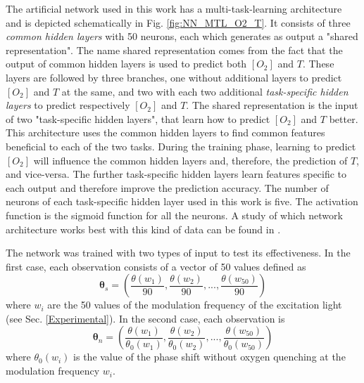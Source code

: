 \documentclass[9pt,twocolumn,twoside,pdftex]{optica}
\begin{document}
The artificial network used in this work has a multi-task-learning architecture and is depicted schematically in Fig. \ref{fig:NN_MTL_O2_T}. It consists of three {\sl common hidden layers} with 50 neurons, each which generates as output a "shared representation". The name shared representation comes from the fact that the output of common hidden layers is used to predict both $[O_2]$ and $T$. These layers are followed by three branches, one without additional layers to predict $[O_2]$ and $T$ at the same, and two with each two additional {\sl task-specific hidden layers} to predict respectively $[O_2]$ and $T$. The shared representation is the input of two "task-specific hidden layers", that learn how to predict $[O_2]$ and $T$ better. This architecture uses the common hidden layers to find common features beneficial to each of the two tasks. During the training phase, learning to predict $[O_2]$ will influence the common hidden layers and, therefore, the prediction of $T$, and vice-versa. The further task-specific hidden layers learn features specific to each output and therefore improve the prediction accuracy. The number of neurons of each task-specific hidden layer used in this work is five. The activation function is the sigmoid function for all the neurons.  A study of which network architecture works best with this kind of data can be found in \cite{Michelucci2019_2}.

The network was trained with two types of input to test its effectiveness. In the first case, each observation consists of a vector of 50 values defined as
\begin{equation}
\label{input1}
{\pmb \theta}_s = \left(
\frac{\theta(w_1)}{90} , \frac{\theta(w_2)}{90} , ..., \frac{\theta(w_{50})}{90} 
\right)
\end{equation}
where $w_i$ are the 50 values of the modulation frequency of the excitation light (see Sec. \ref{Experimental}).
In the second case, each observation is
\begin{equation}
\label{input2}
{\pmb \theta}_n = \left(
\frac{\theta(w_1)}{\theta_0(w_1)} , \frac{\theta(w_2)}{\theta_0(w_2)} , ..., \frac{\theta(w_{50})}{\theta_0(w_{50})} 
\right)
\end{equation}
where $\theta_0(w_i)$ is the value of the phase shift without oxygen quenching at the modulation frequency $w_i$.
\end{document}
